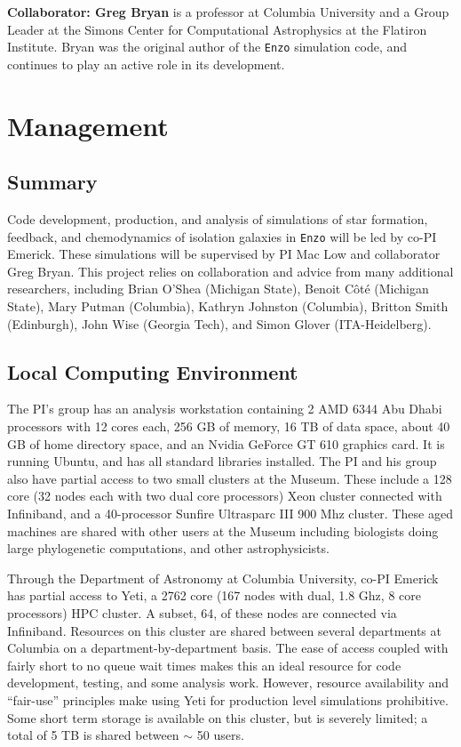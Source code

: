 \documentclass[11pt]{article}
\begin{document}
\textbf{Collaborator: Greg Bryan} is a professor at Columbia University and a Group Leader at the Simons Center for Computational Astrophysics at the Flatiron Institute. Bryan was the original author of the \texttt{Enzo} simulation code, and continues to play an active role in its development. %

\section{Management}

\subsection{Summary}

Code development, production, and analysis of simulations of star formation, feedback, and chemodynamics of isolation galaxies in \texttt{Enzo} will be led by co-PI Emerick. These simulations will be supervised by PI Mac Low and collaborator Greg Bryan. This project relies on collaboration and advice from many additional researchers, including Brian O'Shea (Michigan State), Benoit C{\^o}t{\'e} (Michigan State), Mary Putman (Columbia), Kathryn Johnston (Columbia), Britton Smith (Edinburgh), John Wise (Georgia Tech), and Simon Glover (ITA-Heidelberg).

\subsection{Local Computing Environment}

The PI's group has an analysis workstation containing  2 AMD 6344 Abu Dhabi processors with 12 cores each, 256 GB of memory, 16 TB of data space, about 40 GB of home directory space, and an Nvidia GeForce GT 610 graphics card. It is running Ubuntu, and has all standard libraries installed.  The PI and his group also have partial access to two small clusters at the Museum. These include a 128 core (32 nodes each with two dual core processors) Xeon cluster connected with Infiniband, and a 40-processor Sunfire Ultrasparc III 900 Mhz cluster. These aged machines are shared with other users at the Museum including biologists doing large phylogenetic computations, and other astrophysicists.

Through the Department of Astronomy at Columbia University, co-PI Emerick has partial access to Yeti, a 2762 core (167 nodes with dual, 1.8 Ghz, 8 core processors) HPC cluster. A subset, 64, of these nodes are connected via Infiniband. Resources on this cluster are shared between several departments at Columbia on a department-by-department basis. The ease of access coupled with fairly short to no queue wait times makes this an ideal resource for code development, testing, and some analysis work. However, resource availability and ``fair-use'' principles make using Yeti for production level simulations prohibitive. Some short term storage is available on this cluster, but is severely limited; a total of 5 TB is shared between $\sim$ 50 users.
\end{document}
